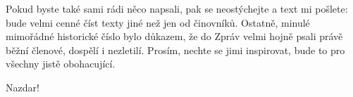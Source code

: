 \documentclass[11pt]{article}
\begin{document}
Pokud byste také sami rádi něco napsali, pak se neostýchejte a text mi
pošlete: bude velmi cenné číst texty jiné než jen od činovníků. Ostatně,
minulé mimořádné historické číslo bylo důkazem, že do Zpráv velmi hojně
psali právě běžní členové, dospělí i nezletilí. Prosím, nechte se jimi
inspirovat, bude to pro všechny jistě obohacující.

\vspace*{12pt}
\noindent
Nazdar!
\clearpage


\pagecolor{sokolred}
\color{white}
\renewcommand{\arraystretch}{1.2}

\newcommand{\boxheight}{11.7cm}

\vspace*{\fill}
\vspace*{0pt}
\end{document}
